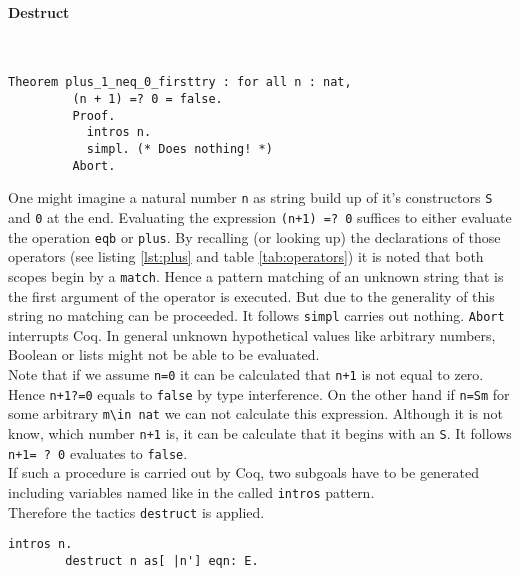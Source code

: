 	   \paragraph{Destruct}	~\vspace{-5mm}
	   \begin{lstlisting}[caption= \lstinline! plus_1_neq_0_firsttry!, label=lst:plus_1_neq_0_firsttry]
	   Theorem plus_1_neq_0_firsttry : for all n : nat,
	     (n + 1) =? 0 = false.
	     Proof.
	       intros n.
	       simpl. (* Does nothing! *)
	     Abort.
	   \end{lstlisting}
	    One might imagine a natural number \lstinline!n! as string build up of it's constructors \lstinline!S! and \lstinline!0! at the end.
	    Evaluating the expression \lstinline!(n+1) =? 0! suffices to either evaluate the operation \lstinline!eqb! or \lstinline!plus!.
	    By recalling (or looking up) the declarations of those operators (see listing \ref{lst:plus} and table \ref{tab:operators}) it is noted that both scopes begin by a \lstinline!match!.
	    Hence a pattern matching of an unknown string that is the first argument of the operator is executed.
	    But due to the generality of this string no matching can be proceeded. It follows \lstinline!simpl! carries out nothing. \lstinline!Abort! interrupts Coq.
	    In general unknown hypothetical values like arbitrary numbers, Boolean or lists might not be able to be evaluated.\\		
		Note that if we assume \lstinline!n=0! it can be calculated that \lstinline!n+1! is not equal to zero.
		Hence \lstinline!n+1?=0! equals to \lstinline!false! by type interference. 
		On the other hand if \lstinline!n=Sm! for some arbitrary \lstinline!m\in nat! we can not calculate this expression.
		Although it is not know, which number \lstinline!n+1! is, it can be calculate that it begins with an \lstinline!S!.
		It follows \lstinline!n+1= ? 0! evaluates to \lstinline!false!.\\	
	    If such a procedure is carried out by Coq, two subgoals have to be generated including variables named like in the called \lstinline!intros! pattern.\\        
	    Therefore the tactics \lstinline!destruct! is applied.	
		\begin{lstlisting}[caption = \lstinline! destruct!]
		intros n.
		destruct n as[ |n'] eqn: E.
		\end{lstlisting}
		

